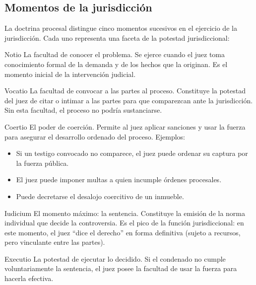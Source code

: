 \documentclass[12pt,oneside]{book}
\begin{document}
\subsection{Momentos de la jurisdicción}

La doctrina procesal distingue cinco momentos sucesivos en el ejercicio de la jurisdicción. Cada uno representa una faceta de la potestad jurisdiccional:

\begin{definition}{Notio}
La facultad de conocer el problema. Se ejerce cuando el juez toma conocimiento formal de la demanda y de los hechos que la originan. Es el momento inicial de la intervención judicial.
\end{definition}

\begin{definition}{Vocatio}
La facultad de convocar a las partes al proceso. Constituye la potestad del juez de citar o intimar a las partes para que comparezcan ante la jurisdicción. Sin esta facultad, el proceso no podría sustanciarse.
\end{definition}

\begin{definition}{Coertio}
El poder de coerción. Permite al juez aplicar sanciones y usar la fuerza para asegurar el desarrollo ordenado del proceso. Ejemplos:
\begin{itemize}
    \item Si un testigo convocado no comparece, el juez puede ordenar su captura por la fuerza pública.
    \item El juez puede imponer multas a quien incumple órdenes procesales.
    \item Puede decretarse el desalojo coercitivo de un inmueble.
\end{itemize}
\end{definition}

\begin{definition}{Iudicium}
El momento máximo: la sentencia. Constituye la emisión de la norma individual que decide la controversia. Es el pico de la función jurisdiccional: en este momento, el juez ``dice el derecho'' en forma definitiva (sujeto a recursos, pero vinculante entre las partes).
\end{definition}

\begin{definition}{Executio}
La potestad de ejecutar lo decidido. Si el condenado no cumple voluntariamente la sentencia, el juez posee la facultad de usar la fuerza para hacerla efectiva.
\end{definition}
\end{document}
